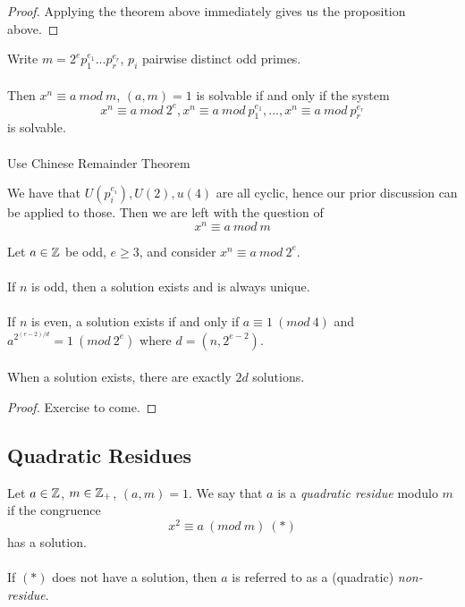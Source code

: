 \begin{proof}
Applying the theorem above immediately gives us the proposition above.
\end{proof}

\begin{theorem}
Write $m = 2^e p_1^{e_1} ... p_r^{e_r}$, $p_i$ pairwise distinct odd primes.\\\\
Then $x^n \equiv a\ mod\ m$, $(a, m) = 1$
is solvable if and only if the system
\[x^n \equiv a\ mod\ 2^e, x^n \equiv a\ mod\ p_1^{e_1}, ..., x^n \equiv a\ mod\ p_r^{e_r}\]
is solvable.\\\\
Use Chinese Remainder Theorem
\end{theorem}

\begin{remark}
We have that $U(p_i^{e_i}), U(2), u(4)$ are all cyclic, hence our prior discussion can be applied to those. Then we are left with the question of
\[x^n \equiv a\ mod\ m\]
\end{remark}

\begin{proposition}[4.2.2]
Let $a \in \mathbb{Z}$ be odd, $e \geq 3$, and consider $x^n \equiv a\ mod\ 2^e$.\\\\
If $n$ is odd, then a solution exists and is always unique.\\\\
If $n$ is even, a solution exists if and only if $a \equiv 1\ (mod\ 4)$ and $a^{2^{(e-2)/d}} = 1\ (mod\ 2^e)$ where $d = (n, 2^{e-2})$.\\\\
When a solution exists, there are exactly $2d$ solutions.
\end{proposition}

\begin{proof}
Exercise to come.
\end{proof}

\subsection{Quadratic Residues}

\begin{definition}
Let $a \in \mathbb{Z}$, $m \in \mathbb{Z}_+$, $(a, m) = 1$. We say that $a$ is a \textit{quadratic residue} modulo $m$ if the congruence
\[x^2 \equiv a\ (mod\ m)\ (*)\]
has a solution.\\\\
If $(*)$ does not have a solution, then $a$ is referred to as a (quadratic) \textit{non-residue}. 
\end{definition}

